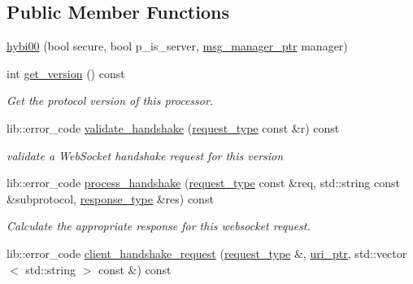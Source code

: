 \subsection*{Public Member Functions}
\begin{DoxyCompactItemize}
\item 
\hyperlink{classwebsocketpp_1_1processor_1_1hybi00_ac9e56c69bfab35accfa60867d49c90f5}{hybi00} (bool secure, bool p\+\_\+is\+\_\+server, \hyperlink{classwebsocketpp_1_1processor_1_1hybi00_aa33fb6bfdb3c905f267ba7d0c48b192e}{msg\+\_\+manager\+\_\+ptr} manager)
\item 
int \hyperlink{classwebsocketpp_1_1processor_1_1hybi00_aac99978196c2e70ccfcef9cd7edaa60f}{get\+\_\+version} () const 
\begin{DoxyCompactList}\small\item\em Get the protocol version of this processor. \end{DoxyCompactList}\item 
lib\+::error\+\_\+code \hyperlink{classwebsocketpp_1_1processor_1_1hybi00_a9189f5d21e698ce02019413f9a9d20b8}{validate\+\_\+handshake} (\hyperlink{classwebsocketpp_1_1processor_1_1hybi00_a9992ac4efa9cc4d46ee0e9e1060cf860}{request\+\_\+type} const \&r) const 
\begin{DoxyCompactList}\small\item\em validate a Web\+Socket handshake request for this version \end{DoxyCompactList}\item 
lib\+::error\+\_\+code \hyperlink{classwebsocketpp_1_1processor_1_1hybi00_a5a2dfb089c6f83037070d08c652cc87f}{process\+\_\+handshake} (\hyperlink{classwebsocketpp_1_1processor_1_1hybi00_a9992ac4efa9cc4d46ee0e9e1060cf860}{request\+\_\+type} const \&req, std\+::string const \&subprotocol, \hyperlink{classwebsocketpp_1_1processor_1_1hybi00_abef7fc8290a6d30e086c639d5e0b393d}{response\+\_\+type} \&res) const 
\begin{DoxyCompactList}\small\item\em Calculate the appropriate response for this websocket request. \end{DoxyCompactList}\item 
lib\+::error\+\_\+code \hyperlink{classwebsocketpp_1_1processor_1_1hybi00_ae75afb2f8989e33c8f79e3223febf4a0}{client\+\_\+handshake\+\_\+request} (\hyperlink{classwebsocketpp_1_1processor_1_1hybi00_a9992ac4efa9cc4d46ee0e9e1060cf860}{request\+\_\+type} \&, \hyperlink{namespacewebsocketpp_aae370ea5ac83a8ece7712cb39fc23f5b}{uri\+\_\+ptr}, std\+::vector$<$ std\+::string $>$ const \&) const 

\end{DoxyCompactItemize}

